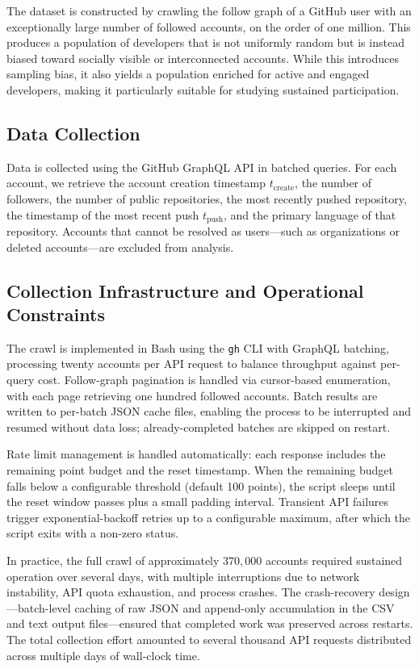 \documentclass[12pt,a4paper]{article}
\begin{document}
The dataset is constructed by crawling the follow graph of a GitHub user with an exceptionally large number of followed accounts, on the order of one million. This produces a population of developers that is not uniformly random but is instead biased toward socially visible or interconnected accounts. While this introduces sampling bias, it also yields a population enriched for active and engaged developers, making it particularly suitable for studying sustained participation.

\subsection{Data Collection}

Data is collected using the GitHub GraphQL API in batched queries. For each account, we retrieve the account creation timestamp $t_{\text{create}}$, the number of followers, the number of public repositories, the most recently pushed repository, the timestamp of the most recent push $t_{\text{push}}$, and the primary language of that repository. Accounts that cannot be resolved as users---such as organizations or deleted accounts---are excluded from analysis.

\subsection{Collection Infrastructure and Operational Constraints}

The crawl is implemented in Bash using the \texttt{gh} CLI with GraphQL batching, processing twenty accounts per API request to balance throughput against per-query cost. Follow-graph pagination is handled via cursor-based enumeration, with each page retrieving one hundred followed accounts. Batch results are written to per-batch JSON cache files, enabling the process to be interrupted and resumed without data loss; already-completed batches are skipped on restart.

Rate limit management is handled automatically: each response includes the remaining point budget and the reset timestamp. When the remaining budget falls below a configurable threshold (default 100 points), the script sleeps until the reset window passes plus a small padding interval. Transient API failures trigger exponential-backoff retries up to a configurable maximum, after which the script exits with a non-zero status.

In practice, the full crawl of approximately $370{,}000$ accounts required sustained operation over several days, with multiple interruptions due to network instability, API quota exhaustion, and process crashes. The crash-recovery design---batch-level caching of raw JSON and append-only accumulation in the CSV and text output files---ensured that completed work was preserved across restarts. The total collection effort amounted to several thousand API requests distributed across multiple days of wall-clock time.
\end{document}
